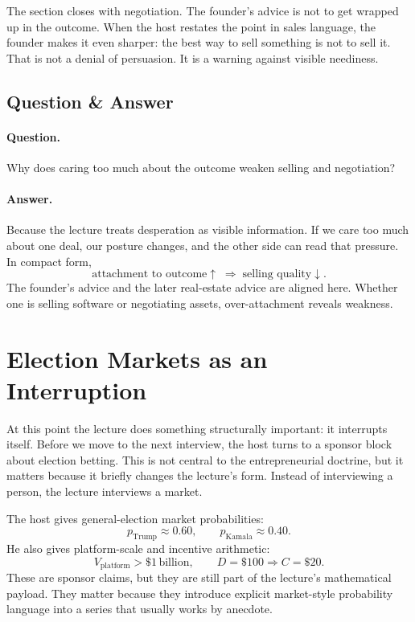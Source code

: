 The section closes with negotiation. The founder's advice is not to get wrapped up in the outcome. When the host restates the point in sales language, the founder makes it even sharper: the best way to sell something is not to sell it. That is not a denial of persuasion. It is a warning against visible neediness.

\subsection{Question \& Answer}

\paragraph{Question.} Why does caring too much about the outcome weaken selling and negotiation?

\paragraph{Answer.} Because the lecture treats desperation as visible information. If we care too much about one deal, our posture changes, and the other side can read that pressure. In compact form,
\begin{equation}
\text{attachment to outcome}\uparrow \;\Rightarrow\; \text{selling quality}\downarrow.
\end{equation}
The founder's advice and the later real-estate advice are aligned here. Whether one is selling software or negotiating assets, over-attachment reveals weakness.

\section{Election Markets as an Interruption}

At this point the lecture does something structurally important: it interrupts itself. Before we move to the next interview, the host turns to a sponsor block about election betting. This is not central to the entrepreneurial doctrine, but it matters because it briefly changes the lecture's form. Instead of interviewing a person, the lecture interviews a market.

The host gives general-election market probabilities:
\begin{equation}
p_{\text{Trump}} \approx 0.60,\qquad
p_{\text{Kamala}} \approx 0.40.
\end{equation}
He also gives platform-scale and incentive arithmetic:
\begin{equation}
V_{\text{platform}} > \$1\,\text{billion},\qquad
D=\$100 \Rightarrow C=\$20.
\end{equation}
These are sponsor claims, but they are still part of the lecture's mathematical payload. They matter because they introduce explicit market-style probability language into a series that usually works by anecdote.

